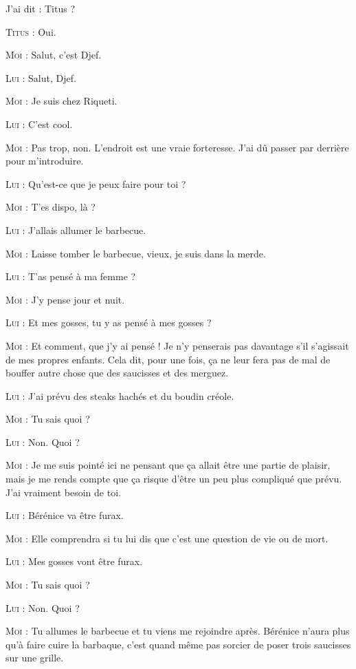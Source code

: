 \begin{dialogue}

J’ai dit : Titus ?

\textsc{Titus} : Oui.

\textsc{Moi} : Salut, c’est Djef.

\textsc{Lui} : Salut, Djef.

\textsc{Moi} : Je suis chez Riqueti.

\textsc{Lui} : C’est cool.

\textsc{Moi} : Pas trop, non. L’endroit est une vraie forteresse. J’ai dû passer par derrière pour m’introduire.

\textsc{Lui} : Qu’est-ce que je peux faire pour toi ?

\textsc{Moi} : T’es dispo, là ?

\textsc{Lui} : J’allais allumer le barbecue.

\textsc{Moi} : Laisse tomber le barbecue, vieux, je suis dans la merde.

\textsc{Lui} : T’as pensé à ma femme ?

\textsc{Moi} : J’y pense jour et nuit.

\textsc{Lui} : Et mes gosses, tu y as pensé à mes gosses ?

\textsc{Moi} : Et comment, que j’y ai pensé ! Je n’y penserais pas davantage s’il s’agissait de mes propres enfants. Cela dit, pour une fois, ça ne leur fera pas de mal de bouffer autre chose que des saucisses et des merguez.

\textsc{Lui} : J’ai prévu des steaks hachés et du boudin créole.

\textsc{Moi} : Tu sais quoi ?

\textsc{Lui} : Non. Quoi ?

\textsc{Moi} : Je me suis pointé ici ne pensant que ça allait être une partie de plaisir, mais je me rends compte que ça risque d’être un peu plus compliqué que prévu. J’ai vraiment besoin de toi.

\textsc{Lui} : Bérénice va être furax.

\textsc{Moi} : Elle comprendra si tu lui dis que c’est une question de vie ou de mort.

\textsc{Lui} : Mes gosses vont être furax.

\textsc{Moi} : Tu sais quoi ?

\textsc{Lui} : Non. Quoi ?

\textsc{Moi} : Tu allumes le barbecue et tu viens me rejoindre après. Bérénice n’aura plus qu’à faire cuire la barbaque, c’est quand même pas sorcier de poser trois saucisses sur une grille.


\end{dialogue}
